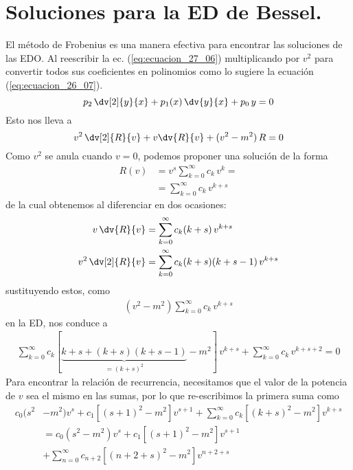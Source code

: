 \section{Soluciones para la ED de Bessel.}
El método de Frobenius es una manera efectiva para encontrar las soluciones de las EDO. Al reescribir la ec. (\ref{eq:ecuacion_27_06}) multiplicando por $v^{2}$ para convertir todos sus coeficientes en polinomios como lo sugiere la ecuación (\ref{eq:ecuacion_26_07}).
\begin{equation}
p_{2} \, \dv[2]{y}{x} + p_{1}(x) \, \dv{y}{x} + p_{0} \, y
 = 0
\label{eq:ecuacion_26_07}
\end{equation}
Esto nos lleva a
\begin{equation}
v^{2} \, \dv[2]{R}{v} + v \dv{R}{v} + (v^{2} - m^{2}) \, R = 0
\label{eq:ecuacion_27_07}
\end{equation}
Como $v^{2}$ se anula cuando $v = 0$, podemos proponer una solución de la forma
\begin{align*}
R(v) &= v^{s} \sum_{k=0}^{\infty} c_{k} \, v^{k} = \\
&= \sum_{k=0}^{\infty} c_{k} \, v^{k+s}
\end{align*}
de la cual obtenemos al diferenciar en dos ocasiones:
\begin{align*}
v \, \dv{R}{v} &= \sum_{k=0}^{\infty} c_{k} (k + s) \, v^{k+s} \\
v^{2} \, \dv[2]{R}{v} &= \sum_{k=0}^{\infty} c_{k} (k + s)(k + s - 1) \, v^{k+s} 
\end{align*}
sustituyendo estos, como
\begin{align*}
(v^{2} - m^{2}) \sum_{k=0}^{\infty} c_{k} \, v^{k+s}
\end{align*}
en la ED, nos conduce a
\begin{align*}
\sum_{k=0}^{\infty} c_{k} [\underbrace{k + s + (k + s)(k + s - 1)}_{=(k+s)^{2}} - m^{2} ] \, v^{k+s} + \sum_{k=0}^{\infty} c_{k} \, v^{k+s+2} = 0
\end{align*}
Para encontrar la relación de recurrencia, necesitamos que el valor de la potencia de $v$ sea el mismo en las sumas, por lo que re-escribimos la primera suma como
\begin{align*}
c_{0}(s^{2} &- m^{2}) v^{s} + c_{1} [(s + 1)^{2}- m^{2}] v^{s+1} + \sum_{k=0}^{\infty} c_{k} [(k + s)^{2} - m^{2}] v^{k+s} \\
&= c_{0}(s^{2} - m^{2}) v^{s} + c_{1} [(s + 1)^{2}- m^{2}] v^{s+1} \\
&+ \sum_{n=0}^{\infty} c_{n+2} [(n + 2 + s)^{2} - m^{2}] v^{n+2+s}
\end{align*}
